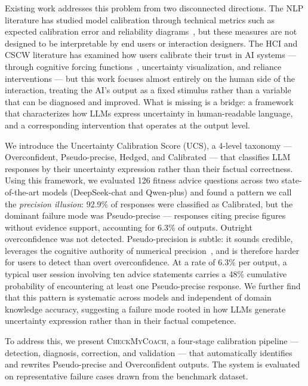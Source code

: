 \documentclass[manuscript, review, anonymous]{acmart}
\begin{document}
Existing work addresses this problem from two disconnected directions. The NLP literature has studied model calibration through technical metrics such as expected calibration error and reliability diagrams~\cite{guo2017calibration}, but these measures are not designed to be interpretable by end users or interaction designers. The HCI and CSCW literature has examined how users calibrate their trust in AI systems — through cognitive forcing functions~\cite{bucinca2021trust}, uncertainty visualization, and reliance interventions — but this work focuses almost entirely on the human side of the interaction, treating the AI's output as a fixed stimulus rather than a variable that can be diagnosed and improved. What is missing is a bridge: a framework that characterizes how LLMs express uncertainty in human-readable language, and a corresponding intervention that operates at the output level.

We introduce the Uncertainty Calibration Score (UCS), a 4-level taxonomy — Overconfident, Pseudo-precise, Hedged, and Calibrated — that classifies LLM responses by their uncertainty expression rather than their factual correctness. Using this framework, we evaluated 126 fitness advice questions across two state-of-the-art models (DeepSeek-chat and Qwen-plus) and found a pattern we call the \emph{precision illusion}: 92.9\% of responses were classified as Calibrated, but the dominant failure mode was Pseudo-precise — responses citing precise figures without evidence support, accounting for 6.3\% of outputs. Outright overconfidence was not detected. Pseudo-precision is subtle: it sounds credible, leverages the cognitive authority of numerical precision~\cite{zhang2012precision, jerez2014precision}, and is therefore harder for users to detect than overt overconfidence. At a rate of 6.3\% per output, a typical user session involving ten advice statements carries a 48\% cumulative probability of encountering at least one Pseudo-precise response. We further find that this pattern is systematic across models and independent of domain knowledge accuracy, suggesting a failure mode rooted in how LLMs generate uncertainty expression rather than in their factual competence.

To address this, we present \textsc{CheckMyCoach}, a four-stage calibration pipeline — detection, diagnosis, correction, and validation — that automatically identifies and rewrites Pseudo-precise and Overconfident outputs. The system is evaluated on representative failure cases drawn from the benchmark dataset.
\end{document}
